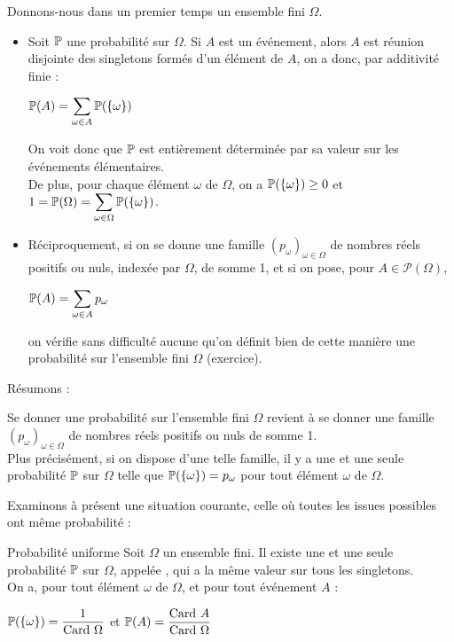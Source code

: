 \documentclass[12pt,a4paper]{report}
\begin{document}
\begin{remarque}{}
Donnons-nous dans un premier temps un ensemble fini $\Omega$.
\begin{itemize}
	\item Soit $\mathbb{P}$ une probabilité sur $\Omega$. Si $A$ est un événement, alors $A$ est réunion disjointe des singletons formés d'un élément de $A$, on a donc, par 
	additivité finie : 
	\begin{center}
	$\mathbb{P}(A) = \displaystyle \sum_{\omega \in A} \mathbb{P}(\{\omega\})$
	\end{center}
	
	On voit donc que $\mathbb{P}$ est entièrement déterminée par sa valeur sur les événements élémentaires. \\
	
	De plus, pour chaque élément $\omega$ de $\Omega$, on a $\mathbb{P}(\{\omega\}) \ge 0$ et $1 = \mathbb{P}(\Omega) = \displaystyle \sum_{\omega \in \Omega} \mathbb{P}(\{\omega\})$.
	
	\item Réciproquement, si on se donne une famille $(p_\omega)_{\omega \in \Omega}$ de nombres réels positifs ou nuls, indexée par $\Omega$, de somme 1, et si on pose, pour $A \in \mathcal{P}(\Omega)$,
	\begin{center}
	$\mathbb{P}(A) = \displaystyle \sum_{\omega \in A} p_\omega$
	\end{center}
	on vérifie sans difficulté aucune qu'on définit bien de cette manière une probabilité sur l'ensemble fini $\Omega$ (exercice).
\end{itemize}
\end{remarque}

Résumons :

\begin{theoreme}{}{}
Se donner une probabilité sur l'ensemble fini $\Omega$ revient à se donner une famille $(p_\omega)_{\omega \in \Omega}$ de nombres réels positifs ou nuls de somme 1. \\
Plus précisément, si on dispose d'une telle famille, il y a une et une seule probabilité $\mathbb{P}$ sur $\Omega$ telle que $\mathbb{P}(\{\omega\}) = p_\omega$ pour tout élément $\omega$ de $\Omega$.
\end{theoreme}

Examinons à présent une situation courante, celle où toutes les issues possibles ont même probabilité : 

\begin{theoreme}{Probabilité uniforme}{}
Soit $\Omega$ un ensemble fini. Il existe une et une seule probabilité $\mathbb{P}$ sur $\Omega$, appelée , qui a la même valeur sur tous les 
singletons. \\
On a, pour tout élément $\omega$ de $\Omega$, et pour tout événement $A$ :
\begin{center}
$\mathbb{P}(\{\omega\}) = \dfrac{1}{\text{Card } \Omega}$ et $\mathbb{P}(A) = \dfrac{\text{Card } A}{\text{Card } \Omega}$
\end{center}
\end{theoreme}
\end{document}
